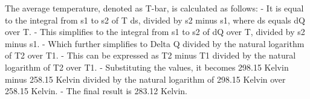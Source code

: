 The average temperature, denoted as T-bar, is calculated as follows:
- It is equal to the integral from s1 to s2 of T ds, divided by s2 minus s1, where ds equals dQ over T.
- This simplifies to the integral from s1 to s2 of dQ over T, divided by s2 minus s1.
- Which further simplifies to Delta Q divided by the natural logarithm of T2 over T1.
- This can be expressed as T2 minus T1 divided by the natural logarithm of T2 over T1.
- Substituting the values, it becomes 298.15 Kelvin minus 258.15 Kelvin divided by the natural logarithm of 298.15 Kelvin over 258.15 Kelvin.
- The final result is 283.12 Kelvin.